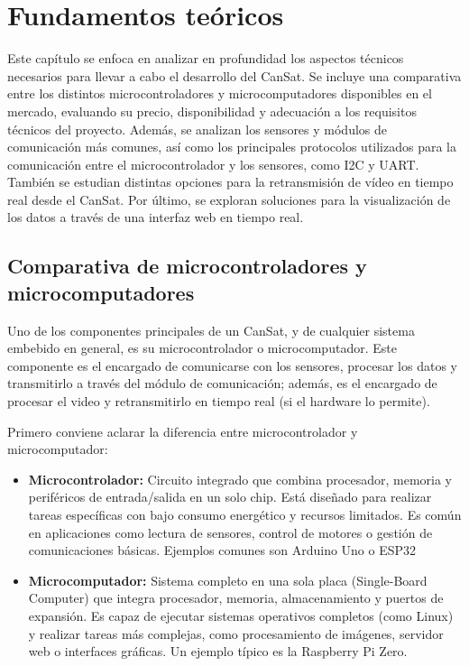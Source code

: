 \chapter{Fundamentos teóricos}
\label{cap:fundamentos_teoricos}
Este capítulo se enfoca en analizar en profundidad los aspectos técnicos necesarios para llevar a cabo el desarrollo del CanSat.
Se incluye una comparativa entre los distintos microcontroladores y microcomputadores disponibles en el mercado, evaluando su precio, disponibilidad y adecuación a los requisitos técnicos del proyecto.
Además, se analizan los sensores y módulos de comunicación más comunes, así como los principales protocolos utilizados para la comunicación entre el microcontrolador y los sensores, como I2C y UART.
También se estudian distintas opciones para la retransmisión de vídeo en tiempo real desde el CanSat.
Por último, se exploran soluciones para la visualización de los datos a través de una interfaz web en tiempo real.


\section{Comparativa de microcontroladores y microcomputadores}
Uno de los componentes principales de un CanSat, y de cualquier sistema embebido en general, es su microcontrolador o microcomputador. Este componente
es el encargado de comunicarse con los sensores, procesar los datos y transmitirlo a través del módulo de comunicación;
además, es el encargado de procesar el video y retransmitirlo en tiempo real (si el hardware lo permite).

Primero conviene aclarar la diferencia entre microcontrolador y microcomputador:
\begin{itemize}
    \item \textbf{Microcontrolador:} Circuito integrado que combina procesador, memoria y periféricos de entrada/salida en un solo chip.
    Está diseñado para realizar tareas específicas con bajo consumo energético y recursos limitados.
    Es común en aplicaciones como lectura de sensores, control de motores o gestión de comunicaciones básicas.
    Ejemplos comunes son Arduino Uno o ESP32
    \item \textbf{Microcomputador:} Sistema completo en una sola placa (Single-Board Computer) que integra procesador, memoria, almacenamiento y puertos de expansión.
    Es capaz de ejecutar sistemas operativos completos (como Linux) y realizar tareas más complejas, como procesamiento de imágenes, servidor web o interfaces gráficas.
    Un ejemplo típico es la Raspberry Pi Zero.
\end{itemize}

